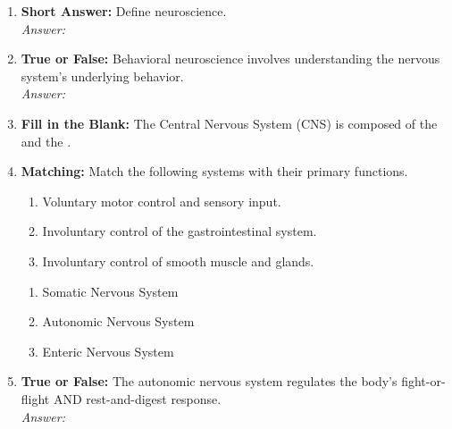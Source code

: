 \begin{enumerate}[label=\textbf{Q1.1.\arabic*}]
      \item \textbf{Short Answer:} Define neuroscience. \\
            \textit{Answer:} \\%

      \item \textbf{True or False:} Behavioral neuroscience involves understanding the nervous system’s underlying behavior. \\
            \textit{Answer:} %

      \item \textbf{Fill in the Blank:} The Central Nervous System (CNS) is composed of the \underline{\hspace{2cm}} and the \underline{\hspace{2cm}}.
            \\

      \item \textbf{Matching:} Match the following systems with their primary functions.
            \begin{wordbox}
                  \begin{enumerate}[label=(\roman*)]
                        \item Voluntary motor control and sensory input.
                        \item Involuntary control of the gastrointestinal system.
                        \item Involuntary control of smooth muscle and glands.
                  \end{enumerate}
            \end{wordbox}
            \begin{enumerate}[label=(\alph*)]
                  \item Somatic Nervous System \quad \dotfill \quad \underline{\hspace{3cm}}\\[0.5em]
                  \item Autonomic Nervous System \quad \dotfill \quad \underline{\hspace{3cm}}\\[0.5em]
                  \item Enteric Nervous System \quad \dotfill \quad \underline{\hspace{3cm}}
            \end{enumerate}
      \item \textbf{True or False:} The autonomic nervous system regulates the body's fight-or-flight AND rest-and-digest response. \\
            \textit{Answer:} %


\end{enumerate}

